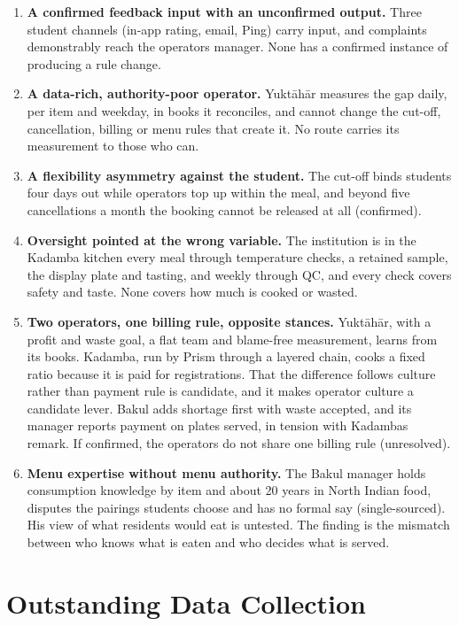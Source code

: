 \documentclass[
  10pt,
  table]{article}
\begin{document}
\begin{enumerate}
\item
  \textbf{A confirmed feedback input with an unconfirmed output.} Three student channels (in-app rating, email, Ping) carry input, and complaints demonstrably reach the operator\textquotesingle s manager. None has a confirmed instance of producing a rule change.
\item
  \textbf{A data-rich, authority-poor operator.} Yuktāhār measures the gap daily, per item and weekday, in books it reconciles, and cannot change the cut-off, cancellation, billing or menu rules that create it. No route carries its measurement to those who can.
\item
  \textbf{A flexibility asymmetry against the student.} The cut-off binds students four days out while operators top up within the meal, and beyond five cancellations a month the booking cannot be released at all (confirmed).
\item
  \textbf{Oversight pointed at the wrong variable.} The institution is in the Kadamba kitchen every meal through temperature checks, a retained sample, the display plate and tasting, and weekly through QC, and every check covers safety and taste. None covers how much is cooked or wasted.
\item
  \textbf{Two operators, one billing rule, opposite stances.} Yuktāhār, with a profit and waste goal, a flat team and blame-free measurement, learns from its books. Kadamba, run by Prism through a layered chain, cooks a fixed ratio because it is paid for registrations. That the difference follows culture rather than payment rule is candidate, and it makes operator culture a candidate lever. Bakul adds shortage first with waste accepted, and its manager reports payment on plates served, in tension with Kadamba\textquotesingle s remark. If confirmed, the operators do not share one billing rule (unresolved).
\item
  \textbf{Menu expertise without menu authority.} The Bakul manager holds consumption knowledge by item and about 20 years in North Indian food, disputes the pairings students choose and has no formal say (single-sourced). His view of what residents would eat is untested. The finding is the mismatch between who knows what is eaten and who decides what is served.
\end{enumerate}

\section{Outstanding Data Collection}\label{outstanding-data-collection}
\end{document}
